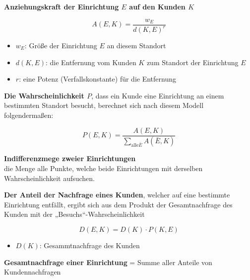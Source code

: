       \begin{defn}
        \textbf{Anziehungskraft der Einrichtung $E$ auf den Kunden $K$}
      \end{defn}
      
      

      \begin{equation}
        A(E, K) = \frac{w_E}{d(K,E) ^ r}
      \end{equation}

      \begin{itemize}
        \item $w_E$: Größe der Einrichtung $E$ an diesem Standort
        \item $d(K, E)$: die Entfernung vom Kunden $K$ zum Standort der Einrichtung $E$
        \item $r$: eine Potenz (Verfallskonstante) für die Entfernung
      \end{itemize}

      \par \textbf{Die Wahrscheinlichkeit $P$}, dass ein Kunde eine Einrichtung an einem bestimmten Standort besucht, berechnet sich nach diesem Modell folgendermaßen:

      \begin{equation}
        P(E, K) = \frac{A(E, K)}{\sum_{\text{alle} \bar{E}}A(\bar{E}, K)}
      \end{equation}

      \begin{defn}
        \textbf{Indifferenzmege zweier Einrichtungen}\\
        die Menge alle Punkte, welche beide Einrichtungen mit derselben Wahrscheinlichkeit aufsuchen.
      \end{defn}

      \par \textbf{Der Anteil der Nachfrage eines Kunden}, welcher auf eine bestimmte Einrichtung entfällt, ergibt sich aus dem Produkt der Gesamtnachfrage des Kunden mit der „Besuchs“-Wahrscheinlichkeit

      \begin{equation}
        D(E, K) = D(K) \cdot P(K, E)
      \end{equation}
      \begin{itemize}
        \item $D(K)$: Gesammtnachfrage des Kunden
      \end{itemize}

      \par \textbf{Gesamtnachfrage einer Einrichtung} = Summe aller Anteile von Kundennachfragen

